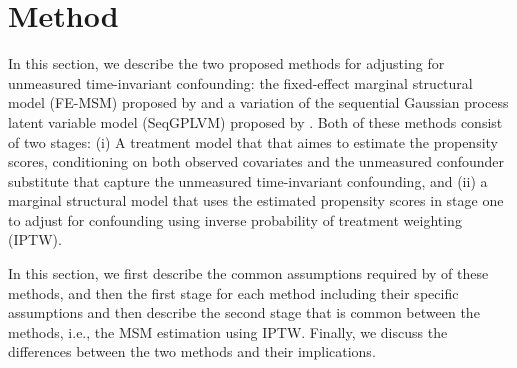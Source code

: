 \chapter{Method}
\label{chap:method}
In this section, we describe the two proposed methods 
for adjusting for unmeasured time-invariant confounding: the fixed-effect marginal 
structural model (FE-MSM) proposed by \cite{blackwellEffectPoliticalAdvertising2024}
and a variation of the sequential Gaussian process latent variable model (SeqGPLVM) 
proposed by \cite{hattSequentialDeconfoundingCausal2024}. Both of 
these methods consist of two stages:  
(i) A treatment model that that aimes to estimate the propensity scores, conditioning 
on both observed covariates and the unmeasured confounder substitute that 
capture the unmeasured time-invariant confounding,
and (ii) a marginal structural model that uses the estimated propensity scores in stage one 
to adjust for confounding 
using inverse probability of treatment weighting (IPTW). 

In this section, we first describe the common assumptions required by of these methods, and then the first stage for each method including 
their specific assumptions and then describe the second stage that is common between the methods, i.e., 
the MSM estimation using IPTW. 
Finally, we discuss the differences between the two methods and their implications.







